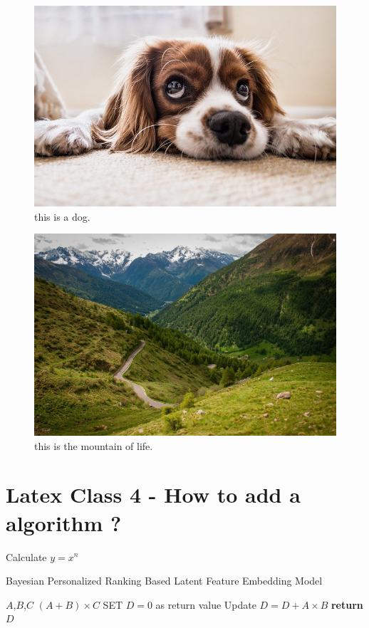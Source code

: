 \documentclass{article}
\begin{document}
\begin{figure}[h]
\centering
\includegraphics[scale=0.25]{dog.jpg}
\caption{this is a dog.}
\label{fig:dog}
\end{figure}

\begin{figure}[h]
\centering
\includegraphics[scale=0.25]{fig1.jpg}
\caption{this is the mountain of life.}
\label{fig:nature}
\end{figure}

\section{Latex Class 4 - How to add a algorithm ?}
\begin{algorithm} 
	\caption{Calculate $y = x^n$} 
	\label{alg3} 
	\renewcommand{\algorithmicrequire}{\textbf{Input:}}
	\renewcommand{\algorithmicensure}{\textbf{Output:}}
	\caption{Bayesian Personalized Ranking Based Latent Feature Embedding Model}
	\label{alg:1}
	\begin{algorithmic}[1]
		\REQUIRE $A$,$B$,$C$
		\ENSURE $(A+B)\times C$
		\STATE SET $D=0$ as return value
 		\STATE Update $D=D+A\times B$
 		\ENDFOR
		\STATE \textbf{return} $D$
	\end{algorithmic}  
\end{algorithm}




\end{document}

